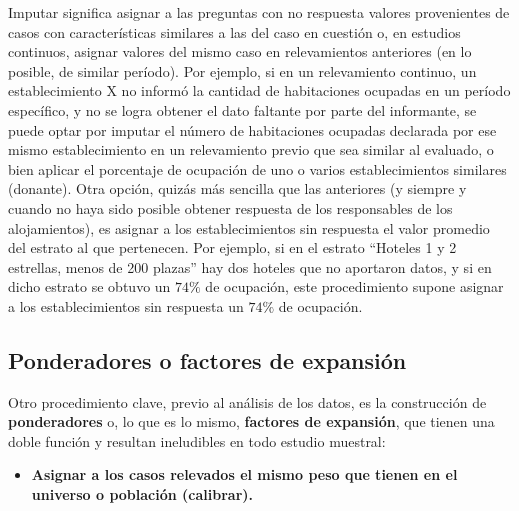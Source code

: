 \documentclass[
]{book}
\providecommand{\tightlist}{%
  \setlength{\itemsep}{0pt}\setlength{\parskip}{0pt}}
\begin{document}
Imputar significa asignar a las preguntas con no respuesta valores provenientes de casos con características similares a las del caso en cuestión o, en estudios continuos, asignar valores del mismo caso en relevamientos anteriores (en lo posible, de similar período). Por ejemplo, si en un relevamiento continuo, un establecimiento X no informó la cantidad de habitaciones ocupadas en un período específico, y no se logra obtener el dato faltante por parte del informante, se puede optar por imputar el número de habitaciones ocupadas declarada por ese mismo establecimiento en un relevamiento previo que sea similar al evaluado, o bien aplicar el porcentaje de ocupación de uno o varios establecimientos similares (donante). Otra opción, quizás más sencilla que las anteriores (y siempre y cuando no haya sido posible obtener respuesta de los responsables de los alojamientos), es asignar a los establecimientos sin respuesta el valor promedio del estrato al que pertenecen. Por ejemplo, si en el estrato ``Hoteles 1 y 2 estrellas, menos de 200 plazas'' hay dos hoteles que no aportaron datos, y si en dicho estrato se obtuvo un \(74\%\) de ocupación, este procedimiento supone asignar a los establecimientos sin respuesta un \(74\%\) de ocupación.

\hypertarget{ponderadores-o-factores-de-expansiuxf3n}{%
\subsection{Ponderadores o factores de expansión}\label{ponderadores-o-factores-de-expansiuxf3n}}

Otro procedimiento clave, previo al análisis de los datos, es la construcción de \textbf{ponderadores} o, lo que es lo mismo, \textbf{factores de expansión}, que tienen una doble función y resultan ineludibles en todo estudio muestral:

\begin{itemize}
\tightlist
\item
  \textbf{Asignar a los casos relevados el mismo peso que tienen en el universo o población (calibrar).}
\end{itemize}
\end{document}
